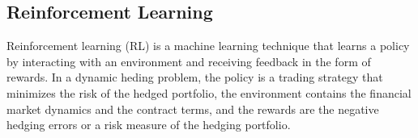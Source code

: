 \subsection{Reinforcement Learning}
Reinforcement learning (RL) is a machine learning technique that learns a policy by interacting with an environment and receiving feedback in the form of rewards.
In a dynamic heding problem, the policy is a trading strategy that minimizes the risk of the hedged portfolio, the environment contains the financial market dynamics and the contract terms, and the rewards are the negative hedging errors or a risk measure of the hedging portfolio.


